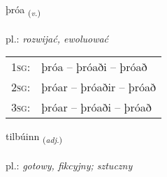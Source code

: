 \documentclass[frontgrid, backgrid]{flacards}\usepackage[]{graphicx}\usepackage[]{xcolor}
\begin{document}
\renewcommand{\blhead}{\vskip5pt {\small\bfseries\footnotesize Sagnorð | Verb }}
\renewcommand{\bcfoot}{\vskip5pt \hspace{2pt}{\small\bfseries\footnotesize 1K}}


{þróa \small{\textsubscript{(\textit{v.})}} \\[1ex] %
\textphonetic{[θrouːa]} \\
pl.: \emph{rozwijać, ewoluować} \\  [2ex]
\renewcommand*{\arraystretch}{0.8}
\begin{tabular}{p{1cm}l}
\textsc{1sg}: & þróa -- þróaði -- þróað \\ 
\textsc{2sg}: & þróar -- þróaðir -- þróað \\ 
\textsc{3sg}: & þróar -- þróaði -- þróað \\ 
\end{tabular}
}

\renewcommand{\flhead}{\vskip5pt \fboxsep=0pt {\small\bfseries\footnotesize Lýsingarorð | Adjective}}
\renewcommand{\fcfoot}{\vskip5pt \fboxsep=0pt \hspace{2pt}{\small\bfseries\footnotesize 1K}}

\renewcommand{\blhead}{\vskip5pt {\small\bfseries\footnotesize Lýsingarorð | Adjective }}
\renewcommand{\bcfoot}{\vskip5pt \hspace{2pt}{\small\bfseries\footnotesize 1K}}


{tilbúinn \small{\textsubscript{(\textit{adj.})}} \\[1ex] %
\textphonetic{[tʰɪlpuɪn]} \\
pl.: \emph{gotowy, fikcyjny; sztuczny} \\  [2ex]
\renewcommand*{\arraystretch}{0.8}
}
\end{document}
